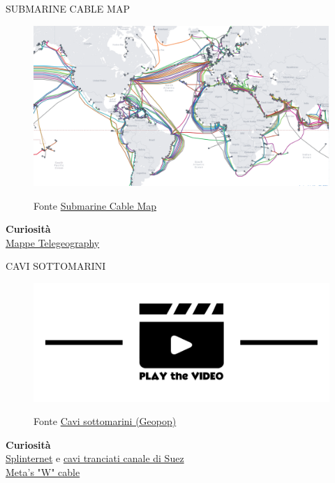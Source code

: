 \documentclass[aspectratio=1610]{beamer}
\begin{document}
\begin{frame}{SUBMARINE CABLE MAP}
    \begin{figure}
        \href{https://www.submarinecablemap.com/}{\includegraphics[width=.8\linewidth]{img/SubmarineCableMap.png}}
        \caption{{Fonte \href{https://www.submarinecablemap.com/}{Submarine Cable Map}}}
    \end{figure}       
    \bigskip
    \tiny{\textbf{Curiosità}}\\
    \tiny{\href{https://blog.telegeography.com/topic/maps}{Mappe Telegeography}} 
\end{frame}

\begin{frame}{CAVI SOTTOMARINI}
    \begin{figure}
        \href{https://www.geopop.it/serie/cavi-sottomarini/}{\includegraphics[width=\linewidth]{img/play.png}}
        \caption{{Fonte \href{https://www.geopop.it/serie/cavi-sottomarini/}{Cavi sottomarini (Geopop)}}}
    \end{figure}   
    \bigskip
    \tiny{\textbf{Curiosità}}\\
    \tiny{
        \href{https://www.cybersecurity360.it/cybersecurity-nazionale/lera-di-splinternet-cosi-la-geopolitica-sta-fratturando-il-cyberspazio/}{Splinternet} e 
        \href{https://www.agendadigitale.eu/infrastrutture/cavi-tranciati-a-suez-goretti-namex-ecco-come-ridurre-il-rischio/}{cavi tranciati canale di Suez}\\
        \href{https://techcrunch.com/2024/11/29/meta-plans-to-build-a-10b-subsea-cable-spanning-the-world-sources-say/}{Meta's "W" cable}
    }     
\end{frame}
\end{document}
